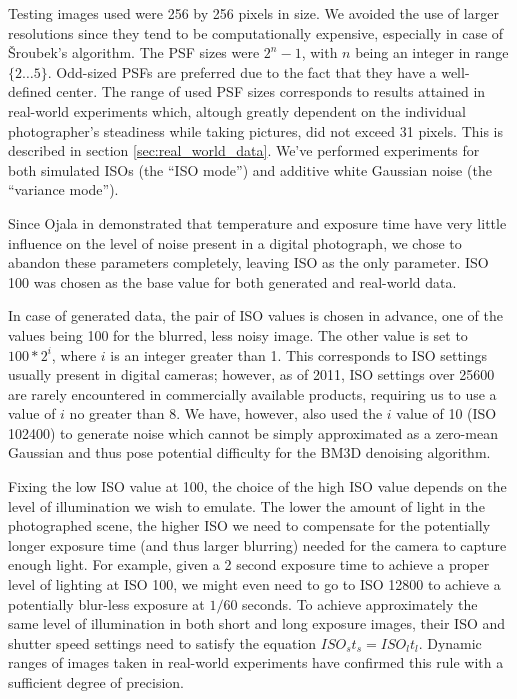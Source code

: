 \documentclass[12pt,notitlepage]{report}
\begin{document}
Testing images used were 256 by 256 pixels in size. We avoided the use of larger resolutions since they tend to be computationally expensive, especially in case of Šroubek's algorithm. The PSF sizes were $2^n - 1$, with $n$ being an integer in range $\lbrace 2 \dots 5 \rbrace$. Odd-sized PSFs are preferred due to the fact that they have a well-defined center. The range of used PSF sizes corresponds to results attained in real-world experiments which, altough greatly dependent on the individual photographer's steadiness while taking pictures,  did not exceed 31 pixels. This is described in section \ref{sec:real_world_data}. We've performed experiments for both simulated ISOs (the ``ISO mode'') and additive white Gaussian noise  (the ``variance mode'').

Since Ojala in \cite{ojal08} demonstrated that temperature and exposure time have very little influence on the level of noise present in a digital photograph, we chose to abandon these parameters completely, leaving ISO as the only parameter. ISO 100 was chosen as the base value for both generated and real-world data. 

In case of generated data, the pair of ISO values is chosen in advance, one of the values being 100 for the blurred, less noisy image. The other value is set to $100*2^i$, where $i$ is an integer greater than 1. This corresponds to ISO settings usually present in digital cameras; however, as of 2011, ISO settings over 25600 are rarely encountered in commercially available products, requiring us to use a value of $i$ no greater than 8. We have, however, also used the $i$ value of 10 (ISO 102400) to generate noise which cannot be simply approximated as a zero-mean Gaussian and thus pose potential difficulty for the BM3D denoising algorithm.  

Fixing the low ISO value at 100, the choice of the high ISO value depends on the level of illumination we wish to emulate. The lower the amount of light in the photographed scene, the higher ISO we need to compensate for the potentially longer exposure time (and thus larger blurring) needed for the camera to capture enough light. For example, given a 2 second exposure time to achieve a proper level of lighting at ISO 100, we might even need to go to ISO 12800 to achieve a potentially blur-less exposure at $1/60$ seconds. To achieve approximately the same level of illumination in both short and long exposure images, their ISO and shutter speed settings need to satisfy the equation $ISO_s t_s = ISO_l t_l$. Dynamic ranges of images taken in real-world experiments have confirmed this rule with a sufficient degree of precision.  
\end{document}
